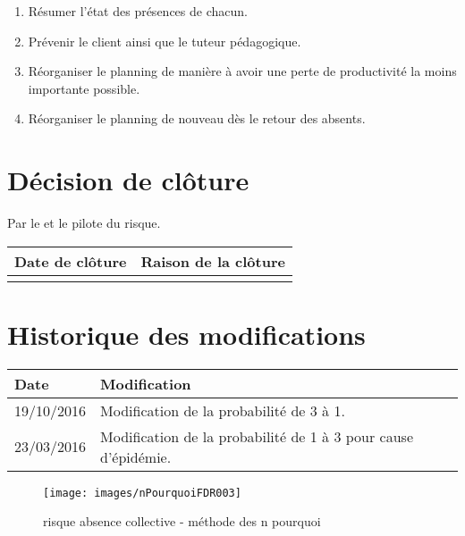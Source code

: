 \begin{enumerate}
	\item Résumer l'état des présences de chacun.
	\item Prévenir le client ainsi que le tuteur pédagogique.
	\item Réorganiser le planning de manière à avoir une perte de productivité la moins importante possible.
	\item Réorganiser le planning de nouveau dès le retour des absents.
\end{enumerate}

\section*{Décision de clôture}
Par le \CP{} et le pilote du risque.
\begin{table}[H]
\centering
	\begin{tabularx}{12.8cm}{|X|X|}
	\hline
	\rowcolor{gray!40} Date de clôture & Raison de la clôture \\
	\hline
	  & \\
	\hline
	\end{tabularx}
\end{table}

\section*{Historique des modifications}
\begin{table}[H]
\centering
	\begin{tabularx}{12.8cm}{|X|X|}
	\hline
	\rowcolor{gray!40} Date & Modification \\
	\hline
	 19/10/2016 & Modification de la probabilité de 3 à 1. \\
	\hline
	 23/03/2016 & Modification de la probabilité de 1 à 3 pour cause d'épidémie. \\
	\hline
	\end{tabularx}
\end{table}
\newpage


\begin{figure}
	\centering
	\texttt{[image: images/nPourquoiFDR003]}
        \caption{\label{risque absence collective}risque absence collective - méthode des n pourquoi}
\end{figure}
